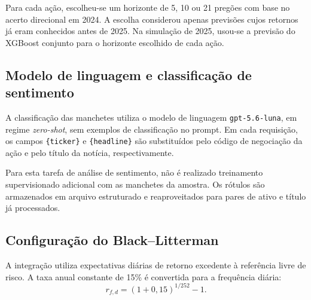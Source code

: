 Para cada ação, escolheu-se um horizonte de 5, 10 ou
21 pregões com base no acerto direcional em 2024. A
escolha considerou apenas previsões cujos retornos já
eram conhecidos antes de 2025. Na simulação de 2025,
usou-se a previsão do XGBoost conjunto para o horizonte
escolhido de cada ação.

\subsection{Modelo de linguagem e classificação de sentimento}

A classificação das manchetes utiliza o modelo de
linguagem \texttt{gpt-5.6-luna}, em regime
\emph{zero-shot}, sem exemplos de classificação no
prompt. Em cada requisição, os campos
\texttt{\{ticker\}} e \texttt{\{headline\}} são
substituídos pelo código de negociação da ação e
pelo título da notícia, respectivamente.

\par\smallskip
\noindent
\begingroup
\setlength{\fboxsep}{5pt}
\endgroup
\par\smallskip

Para esta tarefa de análise de sentimento, não é realizado treinamento supervisionado adicional com as manchetes da amostra. Os rótulos são armazenados em arquivo estruturado e reaproveitados para pares de ativo e título já processados.

\subsection{Configuração do Black--Litterman}
\label{sec:configuracao_bl_cap4}

A integração utiliza expectativas diárias de retorno
excedente à referência livre de risco. A taxa anual
constante de 15\% é convertida para a frequência diária:
\begin{equation}
r_{f,d}
=
(1+0,15)^{1/252}-1.
\label{eq:selic_cap4}
\end{equation}

